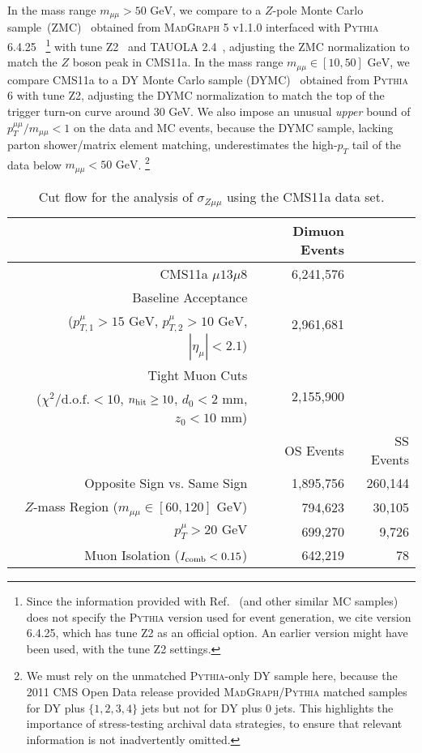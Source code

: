 \documentclass[aps,prd,twocolumn,superscriptaddress,preprintnumbers,nofootinbib,longbibliography,floatfix]{revtex4-1}
\newcommand{\ptmm}{p_T^{\mu\mu}}
\newcommand{\GeV}{\text{~GeV}}
\DeclareRobustCommand{\Ref}[1]{Ref.~\cite{#1}}
\begin{document}
In the mass range $m_{\mu\mu} > 50 \GeV$, we compare to a $Z$-pole Monte Carlo sample~(ZMC)~\cite{CMS:ZMC} obtained from \textsc{MadGraph} 5 v1.1.0 \cite{Alwall:2011uj} interfaced with \textsc{Pythia} 6.4.25~\cite{Sjostrand:2006za}%
\footnote{Since the information provided with \Ref{CMS:ZMC} (and other similar MC samples) does not specify the \textsc{Pythia} version used for event generation, we cite version 6.4.25, which has tune Z2 as an official option.  An earlier version might have been used, with the tune Z2 settings.}
%
with tune Z2~\cite{Field:2011iq} and TAUOLA 2.4~\cite{Jadach:1993hs}, adjusting the ZMC normalization to match the $Z$ boson peak in CMS11a. 
%
In the mass range $m_{\mu\mu} \in [10,50] \GeV$, we compare CMS11a to a DY Monte Carlo sample (DYMC)~\cite{CMS:DYMC} obtained from \textsc{Pythia} 6 with tune Z2, adjusting the DYMC normalization to match the top of the trigger turn-on curve around 30 GeV.  
%
We also impose an unusual {\it upper} bound of $\ptmm/m_{\mu\mu}<1$ on the data and MC events, because the DYMC sample, lacking parton shower/matrix element matching,  underestimates the high-$p_T$ tail of the data below $m_{\mu\mu}< 50 \GeV$.%
%
\footnote{We must rely on the unmatched \textsc{Pythia}-only DY sample here, because the 2011 CMS Open Data release provided \textsc{MadGraph}/\textsc{Pythia} matched samples for DY plus $\{1,2,3,4\}$ jets \cite{CMS:DY1JetMC,CMS:DY2JetMC,CMS:DY3JetMC,CMS:DY4JetMC} but not for DY plus 0 jets.  This highlights the importance of stress-testing archival data strategies, to ensure that relevant information is not inadvertently omitted.}

\begin{table*}[t]
\centering
\begin{tabular}{ r @{$\quad$} r @{$\quad$} r } 
 \hline
 \hline
  & Dimuon Events \\
\hline
CMS11a $\mu13\mu8$ & 6,241,576 & \\
Baseline Acceptance  &  \multirow{2}{*}{2,961,681} \\
($p_{T,1}^\mu > 15 \GeV$, $p_{T,2}^\mu> 10 \GeV$, $|\eta_\mu| < 2.1$)  \\
 Tight Muon Cuts  &  \multirow{2}{*}{2,155,900} \\
 ($\chi^2/\text{d.o.f.} < 10$, $n_{\rm hit} \ge 10$, $d_0<2$ mm, $z_0<10$ mm) \\
\hline
\hline
 & OS Events & SS Events \\
 \hline
 Opposite Sign vs. Same Sign & 1,895,756 & 260,144 \\
 $Z$-mass Region ($m_{\mu\mu}\in [60,120] \GeV$) & 794,623 & 30,105\\
 $p_{T}^\mu>20\GeV$ & 699,270 & 9,726\\
 Muon Isolation ($I_{\rm comb}<0.15$) & 642,219 & 78\\
 \hline
 \hline
 \end{tabular}
\caption{Cut flow for the analysis of $\sigma_{Z\mu\mu}$ using the CMS11a data set.}
\label{tab:ZXsecCut}
\end{table*}
\end{document}
